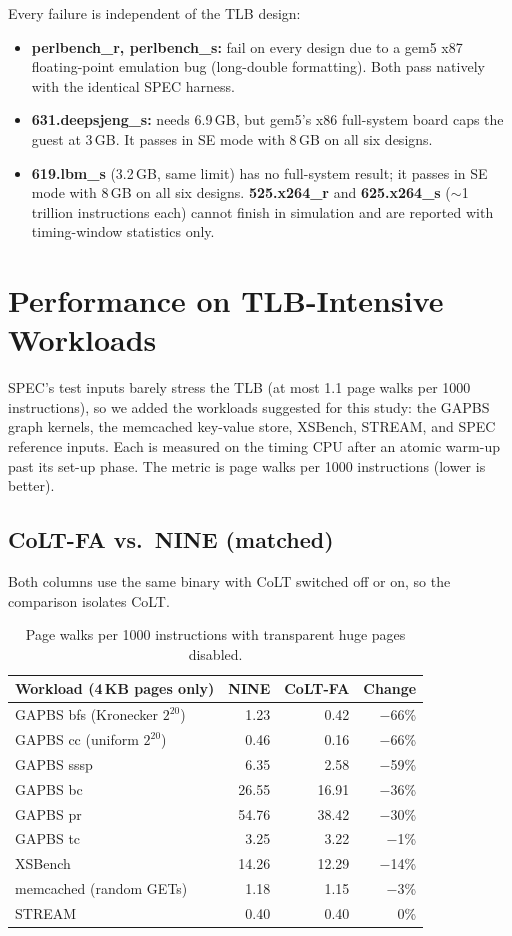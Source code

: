 \documentclass[11pt]{article}
\begin{document}
\noindent Every failure is independent of the TLB design:
\begin{itemize}
  \item \textbf{perlbench\_r, perlbench\_s:} fail on every design due to a gem5 x87 floating-point emulation bug (long-double formatting). Both pass natively with the identical SPEC harness.
  \item \textbf{631.deepsjeng\_s:} needs 6.9\,GB, but gem5's x86 full-system board caps the guest at 3\,GB. It passes in SE mode with 8\,GB on all six designs.
  \item \textbf{619.lbm\_s} (3.2\,GB, same limit) has no full-system result; it passes in SE mode with 8\,GB on all six designs. \textbf{525.x264\_r} and \textbf{625.x264\_s} ($\sim$1 trillion instructions each) cannot finish in simulation and are reported with timing-window statistics only.
\end{itemize}

\section{Performance on TLB-Intensive Workloads}
SPEC's test inputs barely stress the TLB (at most 1.1 page walks per 1000 instructions), so we added the workloads suggested for this study: the GAPBS graph kernels, the memcached key-value store, XSBench, STREAM, and SPEC reference inputs. Each is measured on the timing CPU after an atomic warm-up past its set-up phase. The metric is page walks per 1000 instructions (lower is better).

\subsection{CoLT-FA vs.\ NINE (matched)}
Both columns use the same binary with CoLT switched off or on, so the comparison isolates CoLT.

\begin{table}[H]
\centering
\begin{tabularx}{\textwidth}{@{}L R R R@{}}
\toprule
\textbf{Workload (4\,KB pages only)} & \textbf{NINE} & \textbf{CoLT-FA} & \textbf{Change} \\
\midrule
GAPBS bfs (Kronecker $2^{20}$) & 1.23 & 0.42 & $-$66\% \\
GAPBS cc (uniform $2^{20}$) & 0.46 & 0.16 & $-$66\% \\
GAPBS sssp & 6.35 & 2.58 & $-$59\% \\
GAPBS bc & 26.55 & 16.91 & $-$36\% \\
GAPBS pr & 54.76 & 38.42 & $-$30\% \\
GAPBS tc & 3.25 & 3.22 & $-$1\% \\
XSBench & 14.26 & 12.29 & $-$14\% \\
memcached (random GETs) & 1.18 & 1.15 & $-$3\% \\
STREAM & 0.40 & 0.40 & 0\% \\
\bottomrule
\end{tabularx}
\caption{Page walks per 1000 instructions with transparent huge pages disabled.}
\end{table}
\end{document}
